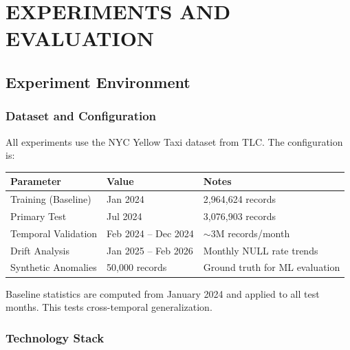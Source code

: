 \newpage
\chapter{EXPERIMENTS AND EVALUATION}
\pagestyle{fancy}

\section{Experiment Environment}

\subsection{Dataset and Configuration}

All experiments use the NYC Yellow Taxi dataset from TLC. The configuration is:

\begin{longtable}{|m{4cm}|m{5cm}|m{4cm}|}
\hline
\textbf{Parameter} & \textbf{Value} & \textbf{Notes} \\ \hline
Training (Baseline) & Jan 2024 & 2,964,624 records \\ \hline
Primary Test & Jul 2024 & 3,076,903 records \\ \hline
Temporal Validation & Feb 2024 -- Dec 2024 & $\sim$3M records/month \\ \hline
Drift Analysis & Jan 2025 -- Feb 2026 & Monthly NULL rate trends \\ \hline
Synthetic Anomalies & 50,000 records & Ground truth for ML evaluation \\ \hline
\end{longtable}

Baseline statistics are computed from January 2024 and applied to all test months. This tests cross-temporal generalization.

\subsection{Technology Stack}

